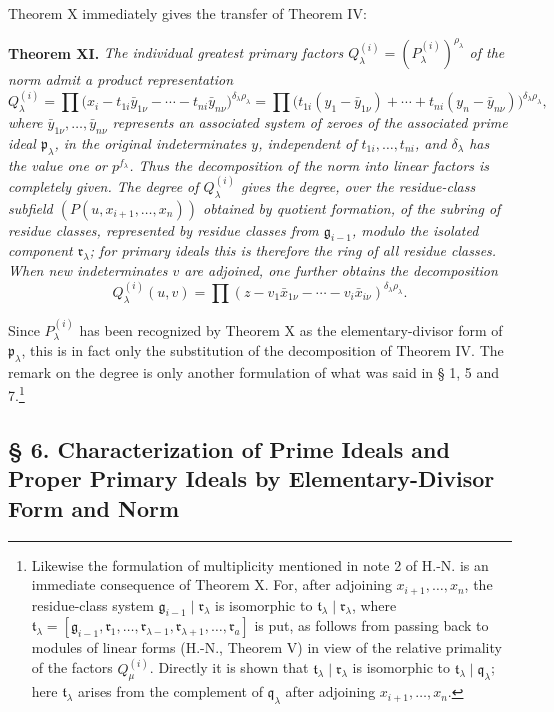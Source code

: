 \documentclass[11pt]{article}
\providecommand{\frakp}{\mathfrak p}
\providecommand{\frakq}{\mathfrak q}
\providecommand{\frakr}{\mathfrak r}
\providecommand{\frakg}{\mathfrak g}
\providecommand{\frakt}{\mathfrak t}
\begin{document}
Theorem X immediately gives the transfer of Theorem IV:

\textbf{Theorem XI.} \emph{The individual greatest primary factors $Q_\lambda^{(i)}=(P_\lambda^{(i)})^{\rho_\lambda}$ of the norm admit a product representation}
\[
 Q_\lambda^{(i)}=\prod \bigl(x_i-t_{1i}\bar y_{1\nu}-\cdots-t_{ni}\bar y_{n\nu}\bigr)^{\delta_\lambda\rho_\lambda}
 =\prod \bigl(t_{1i}(y_1-\bar y_{1\nu})+\cdots+t_{ni}(y_n-\bar y_{n\nu})\bigr)^{\delta_\lambda\rho_\lambda},
\]
\emph{where $\bar y_{1\nu},\ldots,\bar y_{n\nu}$ represents an associated system of zeroes of the associated prime ideal $\frakp_\lambda$, in the original indeterminates $y$, independent of $t_{1i},\ldots,t_{ni}$, and $\delta_\lambda$ has the value one or $p^{f_\lambda}$. Thus the decomposition of the norm into linear factors is completely given. The degree of $Q_\lambda^{(i)}$ gives the degree, over the residue-class subfield $(P(u,x_{i+1},\ldots,x_n))$ obtained by quotient formation, of the subring of residue classes, represented by residue classes from $\frakg_{i-1}$, modulo the isolated component $\frakr_\lambda$; for primary ideals this is therefore the ring of all residue classes. When new indeterminates $v$ are adjoined, one further obtains the decomposition}
\[
 Q_\lambda^{(i)}(u,v)=\prod (z-v_1\bar x_{1\nu}-\cdots-v_i\bar x_{i\nu})^{\delta_\lambda\rho_\lambda}.
\]

Since $P_\lambda^{(i)}$ has been recognized by Theorem X as the elementary-divisor form of $\frakp_\lambda$, this is in fact only the substitution of the decomposition of Theorem IV. The remark on the degree is only another formulation of what was said in § 1, 5 and 7.\footnote{Likewise the formulation of multiplicity mentioned in note 2 of H.-N. is an immediate consequence of Theorem X. For, after adjoining $x_{i+1},\ldots,x_n$, the residue-class system $\frakg_{i-1}\mid\frakr_\lambda$ is isomorphic to $\frakt_\lambda\mid\frakr_\lambda$, where $\frakt_\lambda=[\frakg_{i-1},\frakr_1,\ldots,\frakr_{\lambda-1},\frakr_{\lambda+1},\ldots,\frakr_a]$ is put, as follows from passing back to modules of linear forms (H.-N., Theorem V) in view of the relative primality of the factors $Q_\mu^{(i)}$. Directly it is shown that $\frakt_\lambda\mid\frakr_\lambda$ is isomorphic to $\frakt_\lambda\mid\frakq_\lambda$; here $\frakt_\lambda$ arises from the complement of $\frakq_\lambda$ after adjoining $x_{i+1},\ldots,x_n$.}

\subsection*{§ 6. Characterization of Prime Ideals and Proper Primary Ideals by Elementary-Divisor Form and Norm}
\end{document}
